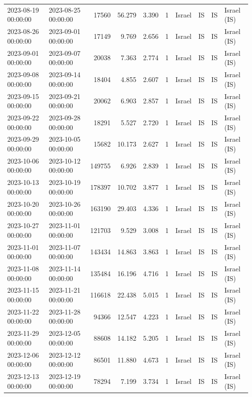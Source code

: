 \begin{tabular}{llrrrlllll}
2023-08-19 00:00:00 & 2023-08-25 00:00:00 & 17560 & 56.279 & 3.390 & 1 & Israel & IS & IS & Israel (IS) \\
2023-08-26 00:00:00 & 2023-09-01 00:00:00 & 17149 & 9.769 & 2.656 & 1 & Israel & IS & IS & Israel (IS) \\
2023-09-01 00:00:00 & 2023-09-07 00:00:00 & 20038 & 7.363 & 2.774 & 1 & Israel & IS & IS & Israel (IS) \\
2023-09-08 00:00:00 & 2023-09-14 00:00:00 & 18404 & 4.855 & 2.607 & 1 & Israel & IS & IS & Israel (IS) \\
2023-09-15 00:00:00 & 2023-09-21 00:00:00 & 20062 & 6.903 & 2.857 & 1 & Israel & IS & IS & Israel (IS) \\
2023-09-22 00:00:00 & 2023-09-28 00:00:00 & 18291 & 5.527 & 2.720 & 1 & Israel & IS & IS & Israel (IS) \\
2023-09-29 00:00:00 & 2023-10-05 00:00:00 & 15682 & 10.173 & 2.627 & 1 & Israel & IS & IS & Israel (IS) \\
2023-10-06 00:00:00 & 2023-10-12 00:00:00 & 149755 & 6.926 & 2.839 & 1 & Israel & IS & IS & Israel (IS) \\
2023-10-13 00:00:00 & 2023-10-19 00:00:00 & 178397 & 10.702 & 3.877 & 1 & Israel & IS & IS & Israel (IS) \\
2023-10-20 00:00:00 & 2023-10-26 00:00:00 & 163190 & 29.403 & 4.336 & 1 & Israel & IS & IS & Israel (IS) \\
2023-10-27 00:00:00 & 2023-11-01 00:00:00 & 121703 & 9.529 & 3.008 & 1 & Israel & IS & IS & Israel (IS) \\
2023-11-01 00:00:00 & 2023-11-07 00:00:00 & 143434 & 14.863 & 3.863 & 1 & Israel & IS & IS & Israel (IS) \\
2023-11-08 00:00:00 & 2023-11-14 00:00:00 & 135484 & 16.196 & 4.716 & 1 & Israel & IS & IS & Israel (IS) \\
2023-11-15 00:00:00 & 2023-11-21 00:00:00 & 116618 & 22.438 & 5.015 & 1 & Israel & IS & IS & Israel (IS) \\
2023-11-22 00:00:00 & 2023-11-28 00:00:00 & 94366 & 12.547 & 4.223 & 1 & Israel & IS & IS & Israel (IS) \\
2023-11-29 00:00:00 & 2023-12-05 00:00:00 & 88608 & 14.182 & 5.205 & 1 & Israel & IS & IS & Israel (IS) \\
2023-12-06 00:00:00 & 2023-12-12 00:00:00 & 86501 & 11.880 & 4.673 & 1 & Israel & IS & IS & Israel (IS) \\
2023-12-13 00:00:00 & 2023-12-19 00:00:00 & 78294 & 7.199 & 3.734 & 1 & Israel & IS & IS & Israel (IS) \\

\end{tabular}
